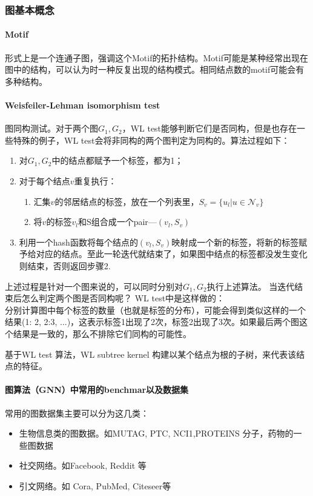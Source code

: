 \subsubsection{图基本概念}
\paragraph{Motif} 形式上是一个连通子图，强调这个Motif的拓扑结构。Motif可能是某种经常出现在图中的结构，可以认为时一种反复出现的结构模式。相同结点数的motif可能会有多种结构。

\paragraph{Weisfeiler-Lehman isomorphism test}  图同构测试。对于两个图$G_1, G_2$，WL test能够判断它们是否同构，但是也存在一些特殊的例子，WL test会将非同构的两个图判定为同构的。算法过程如下：
\begin{enumerate}
	\item 对$G_1, G_2$中的结点都赋予一个标签，都为1；
	\item 对于每个结点$v$重复执行：
	\begin{enumerate}
		\item 汇集$v$的邻居结点的标签，放在一个列表里，$S_v = \{u_l | u \in \mathcal{N}_v \}$
		\item 将$v$的标签$v_l$和S组合成一个pair---$(v_l, S_v)$
	\end{enumerate}
	\item 利用一个hash函数将每个结点的$(v_l, S_v)$映射成一个新的标签，将新的标签赋予给对应的结点。至此一轮迭代就结束了，如果图中结点的标签都没发生变化则结束，否则返回步骤2.
\end{enumerate}
上述过程是针对一个图来说的，可以同时分别对$G_1, G_2$执行上述算法。
当迭代结束后怎么判定两个图是否同构呢？
WL test中是这样做的：\\
分别计算图中每个标签的数量（也就是标签的分布），可能会得到类似这样的一个结果(1: 2, 2:3, ...)，这表示标签1出现了2次，标签2出现了3次。如果最后两个图这个结果是一致的，那么不排除它们同构的可能性。

基于WL test 算法，WL subtree kernel\cite{shervashidze2011weisfeiler} 构建以某个结点为根的子树，来代表该结点的特征。

\paragraph{图算法（GNN）中常用的benchmar以及数据集} 常用的图数据集主要可以分为这几类：
\begin{itemize}
	\item 生物信息类的图数据。如MUTAG, PTC, NCI1,PROTEINS 分子，药物的一些图数据
	\item 社交网络。如Facebook, Reddit 等
	\item 引文网络。如 Cora, PubMed, Citeseer等
\end{itemize}

